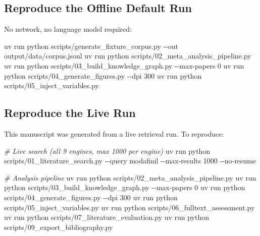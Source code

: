 \documentclass[
]{article}
\newenvironment{Shaded}{}{}
\newcommand{\AttributeTok}[1]{\textcolor[rgb]{0.49,0.56,0.16}{#1}}
\newcommand{\CommentTok}[1]{\textcolor[rgb]{0.38,0.63,0.69}{\textit{#1}}}
\newcommand{\ExtensionTok}[1]{#1}
\newcommand{\NormalTok}[1]{#1}
\begin{document}
\subsection{Reproduce the Offline Default
Run}\label{reproduce-the-offline-default-run}

No network, no language model required:

\begin{Shaded}
\begin{Highlighting}[]
\ExtensionTok{uv}\NormalTok{ run python scripts/generate\_fixture\_corpus.py }\AttributeTok{{-}{-}out}\NormalTok{ output/data/corpus.jsonl}
\ExtensionTok{uv}\NormalTok{ run python scripts/02\_meta\_analysis\_pipeline.py}
\ExtensionTok{uv}\NormalTok{ run python scripts/03\_build\_knowledge\_graph.py }\AttributeTok{{-}{-}max{-}papers}\NormalTok{ 0}
\ExtensionTok{uv}\NormalTok{ run python scripts/04\_generate\_figures.py }\AttributeTok{{-}{-}dpi}\NormalTok{ 300}
\ExtensionTok{uv}\NormalTok{ run python scripts/05\_inject\_variables.py}
\end{Highlighting}
\end{Shaded}

\subsection{Reproduce the Live Run}\label{reproduce-the-live-run}

This manuscript was generated from a live retrieval run. To reproduce:

\begin{Shaded}
\begin{Highlighting}[]
\CommentTok{\# Live search (all 9 engines, max 1000 per engine)}
\ExtensionTok{uv}\NormalTok{ run python scripts/01\_literature\_search.py }\AttributeTok{{-}{-}query}\NormalTok{ modafinil }\AttributeTok{{-}{-}max{-}results}\NormalTok{ 1000 }\AttributeTok{{-}{-}no{-}resume}

\CommentTok{\# Analysis pipeline}
\ExtensionTok{uv}\NormalTok{ run python scripts/02\_meta\_analysis\_pipeline.py}
\ExtensionTok{uv}\NormalTok{ run python scripts/03\_build\_knowledge\_graph.py }\AttributeTok{{-}{-}max{-}papers}\NormalTok{ 0}
\ExtensionTok{uv}\NormalTok{ run python scripts/04\_generate\_figures.py }\AttributeTok{{-}{-}dpi}\NormalTok{ 300}
\ExtensionTok{uv}\NormalTok{ run python scripts/05\_inject\_variables.py}
\ExtensionTok{uv}\NormalTok{ run python scripts/06\_fulltext\_assessment.py}
\ExtensionTok{uv}\NormalTok{ run python scripts/07\_literature\_evaluation.py}
\ExtensionTok{uv}\NormalTok{ run python scripts/09\_export\_bibliography.py}
\end{Highlighting}
\end{Shaded}
\end{document}
